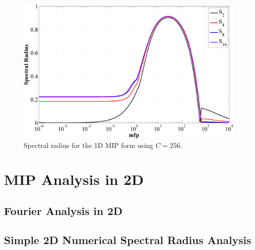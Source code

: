 \begin{figure}
\label{fig::1D_MIP_c=256}
\centering
\includegraphics[width=\textwidth]{figures/appendices/DSA_1D_SI_MIP_C=256.png}
\caption{Spectral radius for the 1D MIP form using $C=256$.}
\end{figure}


\section{MIP Analysis in 2D}
\label{sec::appendix_DSA_2D}

\subsection{Fourier Analysis in 2D}
\label{sec::appendix_DSA_2D_Fourier}





\subsection{Simple 2D Numerical Spectral Radius Analysis}
\label{sec::appendix_DSA_2D_NSR}



